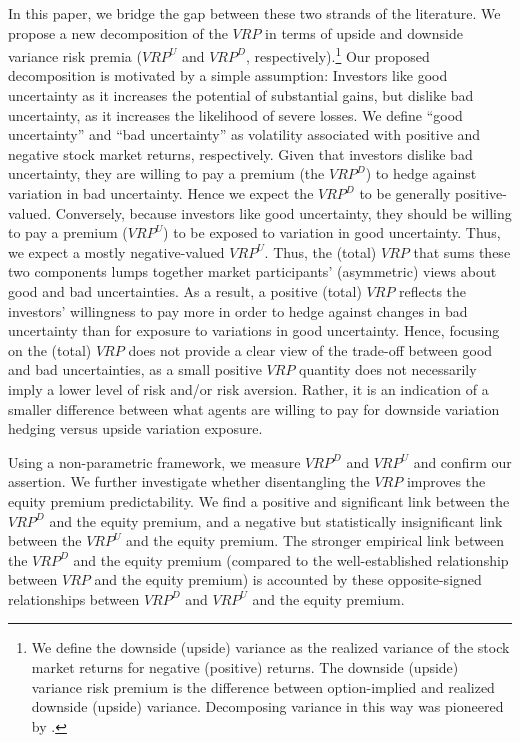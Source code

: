 \documentclass[11pt]{article}
\begin{document}
In this paper, we bridge the gap between these two strands of the literature. We propose a new decomposition of the $VRP$ in terms of upside and downside variance risk premia ($VRP^{U}$ and $VRP^{D}$, respectively).\footnote{We define the downside (upside) variance as the realized variance of the stock market returns for negative (positive) returns. The downside (upside) variance risk premium is the difference between option-implied and realized downside (upside) variance. Decomposing variance in this way was pioneered by \citet*{BNKinnShep}. } Our proposed decomposition is motivated by a simple assumption: Investors like good uncertainty as it increases the potential of substantial gains, but dislike bad uncertainty, as it increases the likelihood of severe losses. We define ``good uncertainty'' and ``bad uncertainty'' as volatility associated with positive and negative stock market returns, respectively. Given that investors dislike bad uncertainty, they are willing to pay a premium (the $VRP^{D}$) to hedge against variation in bad uncertainty. Hence we expect the $VRP^{D}$ to be generally positive-valued. Conversely, because investors like good uncertainty, they should be willing to pay a premium ($VRP^{U}$) to be exposed to variation in good uncertainty. Thus, we expect a mostly negative-valued $VRP^{U}$. Thus, the (total) $VRP$ that sums these two components lumps together market participants' (asymmetric) views about good and bad uncertainties. As a result, a positive (total) $VRP$ reflects the investors' willingness to pay more in order to hedge against changes in bad uncertainty than for exposure to variations in good uncertainty. Hence, focusing on the (total) $VRP$ does not provide a clear view of the trade-off between good and bad uncertainties, as a small positive $VRP$ quantity does not necessarily imply a lower level of risk and/or risk aversion. Rather, it is an indication of a smaller difference between what agents are willing to pay for downside variation hedging versus upside variation exposure.

Using a non-parametric framework, we measure $VRP^{D}$ and $VRP^{U}$ and confirm our assertion. We further investigate whether disentangling the $VRP$ improves the equity premium predictability. We find a positive and significant link between the $VRP^D$ and the equity premium, and a negative but statistically insignificant link between the $VRP^U$ and the equity premium. The stronger empirical link between the $VRP^D$ and the equity premium (compared to the well-established relationship between $VRP$ and the equity premium) is accounted by these opposite-signed relationships between $VRP^D$ and $VRP^U$ and the equity premium.
\end{document}
